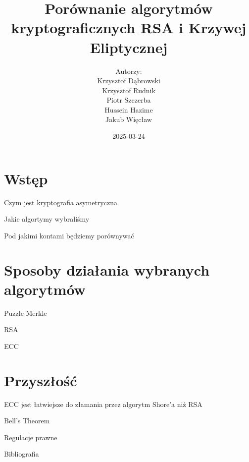 \documentclass{beamer}
\title{Porównanie algorytmów kryptograficznych RSA i Krzywej Eliptycznej}
\author{Autorzy:\\ Krzysztof Dąbrowski\\ Krzysztof Rudnik\\ Piotr Szczerba\\ Hussein Hazime\\ Jakub Więcław}
\date{2025-03-24}
\begin{document}
\begin{frame}
    \titlepage
\end{frame}

\section{Wstęp}
\begin{frame}{Czym jest kryptografia asymetryczna}
\end{frame}

\begin{frame}{Jakie algortymy wybraliśmy}

\end{frame}
\begin{frame}{Pod jakimi kontami będziemy porównywać}

\end{frame}

\section{Sposoby działania wybranych algorytmów}
\begin{frame}{Puzzle Merkle} %

\end{frame}


\begin{frame}{RSA}

\end{frame}



\begin{frame}{ECC}

\end{frame}




\section{Przyszłość}
\begin{frame}{ECC jest łatwiejsze do złamania przez algorytm Shore'a niż RSA}

\end{frame}
\begin{frame}{Bell's Theorem} %

\end{frame}

\begin{frame}{Regulacje prawne}

\end{frame}
\begin{frame}{Bibliografia}
\printbibliography
\end{frame}
\end{document}
